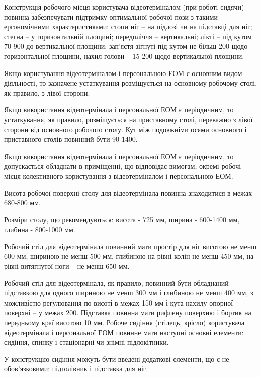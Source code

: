 \documentclass[simple,a4paper,14pt,ukrainian,utf8]{eskdtext}
\begin{document}
\begin{appendices}
                Конструкція робочого місця користувача відеотерміналом (при роботі сидячи) повинна забезпечувати підтримку оптимальної робочої пози з такими ергономічними характеристиками: стопи ніг -- на підлозі чи на підставці для ніг; стегна -- у горизонтальній площині; передпліччя -- вертикальні; лікті -- під кутом 70-900 до вертикальної площини; зап'ястя зігнуті під кутом не більш 200 щодо горизонтальної площини, нахил голови -- 15-200 щодо вертикальної площини.

                Якщо користування відеотерміналом і персональною ЕОМ є основним видом діяльності, то зазначене устаткування розміщується на основному робочому столі, як правило, з лівої сторони.

                Якщо використання відеотермінала і персональної ЕОМ є періодичним, то устаткування, як правило, розміщується на приставному столі, переважно з лівої сторони від основного робочого столу. Кут між подовжніми осями основного і приставного столів повинний бути 90-1400.

                Якщо використання відеотермінала і персональної ЕОМ є періодичним, то допускається обладнати в приміщенні, що відповідає вимогам, окремі робочі місця колективного користування з відеотерміналом і персональною ЕОМ.

                Висота робочої поверхні столу для відеотермінала повинна знаходитися в межах 680-800 мм.

                Розміри столу, що рекомендуються: висота - 725 мм, ширина - 600-1400 мм, глибина - 800-1000 мм.

                Робочий стіл для відеотермінала повинний мати простір для ніг висотою не менш 600 мм, шириною не менш 500 мм, глибиною на рівні колін не менш 450 мм, на рівні витягнутої ноги -- не менш 650 мм.

                Робочий стіл для відеотермінала, як правило, повинний бути обладнаний підставкою для одного шириною не менш 300 мм і глибиною не менш 400 мм, з можливістю регулювання по висоті в межах 150 мм і кута нахилу опорної поверхні -- у межах 200. Підставка повинна мати рифлену поверхню і бортик на передньому краї висотою 10 мм. Робоче сидіння (стілець, крісло) користувача відеотермінала і персональної ЕОМ повинне мати наступні основні елементи: сидіння, спинку і стаціонарні чи знімні підлокітники.

                У конструкцію сидіння можуть бути введені додаткові елементи, що є не обов'язковими: підголівник і підставка для ніг.


\end{appendices}
\end{document}
